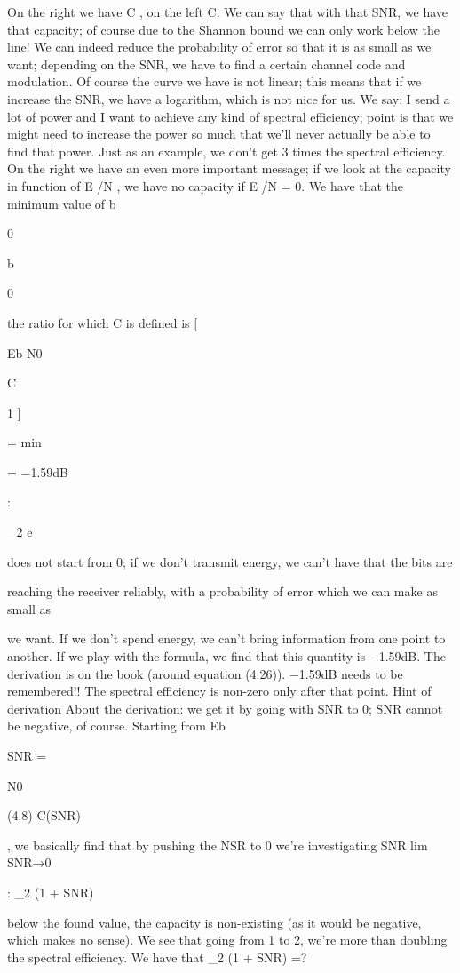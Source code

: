 {{{{{On the right we have C , on the left C. We can say that with that SNR, we have that capacity; of course due to the Shannon bound we can only work below the line! We can indeed reduce the probability of error so that it is as small as we want; depending on the SNR, we have to find a certain channel code and modulation. Of course the curve we have is not linear; this means that if we increase the SNR, we have a logarithm, which is not nice for us.
We say: I send a lot of power and I want to achieve any kind of spectral efficiency;
point is that we might need to increase the power so much that we'll never actually be able to find that power.
Just as an example, we don't get 3 times the spectral efficiency.
On the right we have an even more important message; if we look at the capacity in function of E /N , we have no capacity if E /N = 0. We have that the minimum value of b

0

b

0

the ratio for which C is defined is
[

Eb N0

C

1
]

=
min

= −1.59dB

:

\log_2 e

does not start from 0; if we don't transmit energy, we can't have that the bits are

reaching the receiver reliably, with a probability of error which we can make as small as

we want.
If we don't spend energy, we can't bring information from one point to another. If we play with the formula, we find that this quantity is −1.59dB. The derivation is on the book (around equation (4.26)). −1.59dB needs to be remembered!! The spectral efficiency is non-zero only after that point.
​Hint of derivation About the derivation: we get it by going with SNR to 0; SNR cannot be negative, of course.
Starting from Eb

SNR
=

N0

(4.8)
C(SNR)

, we basically find that by pushing the NSR to 0 we're investigating SNR lim SNR→0

:
\log_2 (1 + SNR)

below the found value, the capacity is non-existing (as it would be negative, which makes no sense).
We see that going from 1 to 2, we're more than doubling the spectral efficiency.
We have that
\log_2 (1 + SNR) =?

}}}}}
